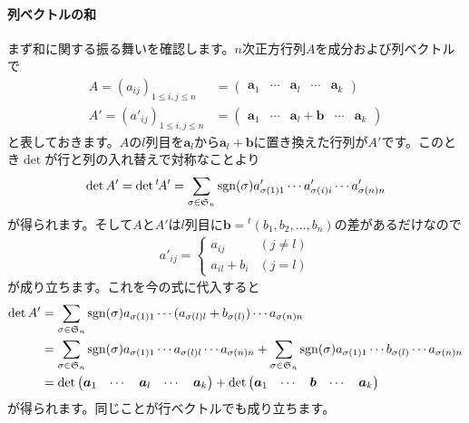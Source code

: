 \paragraph{列ベクトルの和} まず和に関する振る舞いを確認します。$n$次正方行列$A$を成分および列ベクトルで
\begin{align*}
A = (a_{ij})_{1 \leq i, j \leq n}
&= \begin{pmatrix}
\bm{a}_1 & \cdots & \bm{a}_l & \cdots & \bm{a}_k
\end{pmatrix} \\
A' = (a'_{ij})_{1 \leq i, j \leq n}
&= \begin{pmatrix}
\bm{a}_1 & \cdots & \bm{a}_l + \bm{b} & \cdots & \bm{a}_k
\end{pmatrix}
\end{align*}
と表しておきます。$A$の$l$列目を$\bm{a}_l$から$\bm{a}_l + \bm{b}$に置き換えた行列が$A'$です。このとき$\det$が行と列の入れ替えで対称なことより
\[
\det A' = \det {}^t\!A'
= \sum_{\sigma \in \mathfrak{S}_n} \operatorname{sgn}(\sigma) a'_{\sigma(1)1} \cdots a'_{\sigma(i)i} \cdots a'_{\sigma(n)n}
\]
が得られます。そして$A$と$A'$は$l$列目に$\bm{b} = {}^t(b_1, b_2, \ldots, b_n)$の差があるだけなので
\begin{align*}
a'_{ij} = 
\begin{cases}
a_{ij} & (j \neq l) \\
a_{il} + b_i & (j = l)
\end{cases}
\end{align*}
が成り立ちます。これを今の式に代入すると
\begin{align*}
\det A'
&= \sum_{\sigma \in \mathfrak{S}_n} \operatorname{sgn}(\sigma) a_{\sigma(1)1} \cdots (a_{\sigma(l)l} + b_{\sigma(l)}) \cdots a_{\sigma(n)n} \\
&= \sum_{\sigma \in \mathfrak{S}_n} \operatorname{sgn}(\sigma) a_{\sigma(1)1} \cdots a_{\sigma(l)l} \cdots a_{\sigma(n)n}
+ \sum_{\sigma \in \mathfrak{S}_n} \operatorname{sgn}(\sigma) a_{\sigma(1)1} \cdots b_{\sigma(l)} \cdots a_{\sigma(n)n} \\
&= \det
\begin{pmatrix}
\boldsymbol{a}_1 & \cdots & \boldsymbol{a}_l & \cdots & \boldsymbol{a}_k
\end{pmatrix}
+ \det
\begin{pmatrix}
\boldsymbol{a}_1 & \cdots & \boldsymbol{b} & \cdots & \boldsymbol{a}_k
\end{pmatrix}
\end{align*}
が得られます。同じことが行ベクトルでも成り立ちます。

